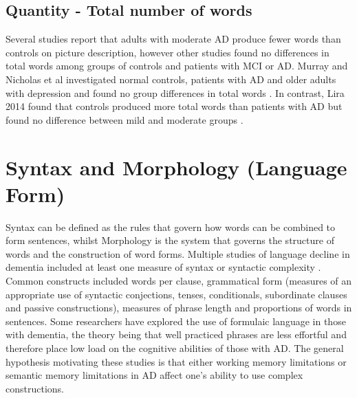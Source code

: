 \documentclass[10pt, letterpaper, twoside, openany]{book}
\begin{document}
\subsection{Quantity - Total number of words}
Several studies report that adults with moderate AD produce fewer words than controls on picture description, however other studies found no differences in total words among groups of controls and patients with MCI or AD. Murray and Nicholas et al investigated normal controls, patients with AD and older adults with depression and found no group differences in total words \cite{Nicholas1985}. In contrast, Lira 2014 found that controls produced more total words than patients with AD but found no difference between mild and moderate groups \cite{Lira2014}.
\par
\section{Syntax and Morphology (Language Form)}
Syntax can be defined as the rules that govern how words can be combined to form sentences, whilst Morphology is the system that governs the structure of words and the construction of word forms. Multiple studies of language decline in dementia included at least one measure of syntax or syntactic complexity \cite{Orimaye2017}. Common constructs included words per clause, grammatical form (measures of an appropriate use of syntactic conjections, tenses, conditionals, subordinate clauses and passive constructions), measures of phrase length and proportions of words in sentences. Some researchers have explored the use of formulaic language in those with dementia, the theory being that well practiced phrases are less effortful and therefore place low load on the cognitive abilities of those with AD. The general hypothesis motivating these studies is that either working memory limitations or semantic memory limitations in AD affect one's ability to use complex constructions.
\par
\end{document}
